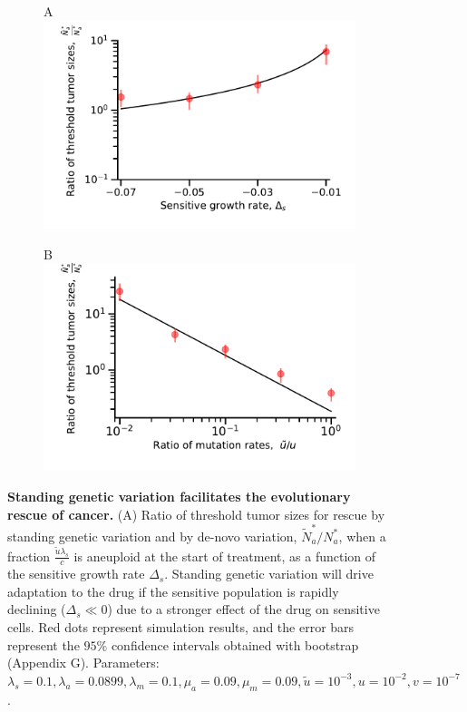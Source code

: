 \documentclass[12pt]{extarticle}
\begin{document}
\begin{figure}
\begin{subfigure}{0.5\textwidth}
A\\
\includegraphics[width=1\textwidth]{Figures/RatiodsPlot.pdf}
\end{subfigure}
\begin{subfigure}{0.5\textwidth}
B\\
\includegraphics[width=1\textwidth]{Figures/ratio_uPlot.pdf}
\end{subfigure}
\caption{
\textbf{Standing genetic variation facilitates the evolutionary rescue of cancer.}
(A)  Ratio of threshold tumor sizes for rescue by standing genetic variation and by de-novo variation, $\tilde{N}_a^*/N_a^*$, when a fraction $\frac{\tilde{u}\lambda_s}{c}$ is aneuploid at the start of treatment, as a function of the sensitive growth rate $\Delta_s$.  Standing genetic variation will drive adaptation to the drug if the sensitive population is rapidly declining ($\Delta_s\ll0$) due to a stronger effect of the drug on sensitive cells. Red dots represent simulation results, and the error bars represent the $95\%$ confidence intervals obtained with bootstrap (Appendix G). Parameters: $\lambda_s=0.1,\lambda_a=0.0899,\lambda_m=0.1,\mu_a=0.09,\mu_m=0.09,\tilde{u}=10^{-3},u=10^{-2}, v=10^{-7}$.
}
\end{figure}
\end{document}
